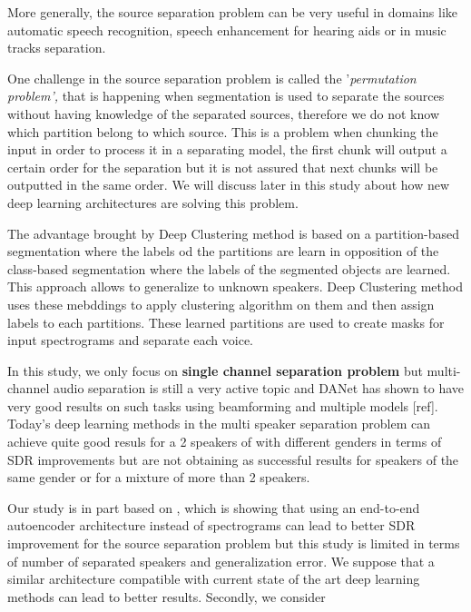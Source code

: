 \documentclass[master,final,11pt]{iscs-thesis}
\begin{document}
More generally, the source separation problem can be very useful in domains like automatic speech recognition, speech enhancement for hearing aids or  
in music tracks separation.


One challenge in the source separation problem is called the '\textit{permutation problem',} that is happening when segmentation is used to separate the sources without having knowledge of the separated sources, therefore we do not know which partition belong to which source. This is a problem when chunking the input in order to process it in a separating model, the first chunk will output a certain order for the separation but it is not assured that next chunks will be outputted in the same order. We will discuss later in this study about how new deep learning architectures are solving this problem.

The advantage brought by Deep Clustering method is based on a partition-based segmentation where the labels od the partitions are learn in opposition of the class-based segmentation where the labels of the segmented objects are learned. This approach allows to generalize to unknown speakers. Deep Clustering method uses these mebddings to apply clustering algorithm on them and then assign labels to each partitions. These learned partitions are used to create masks for input spectrograms and separate each voice.

In this study, we only focus on \textbf{single channel separation problem} but multi-channel audio separation is still a very active topic and DANet has shown to have very good results on such tasks using beamforming and multiple models [ref]. Today's deep learning methods in the multi speaker separation problem  can achieve quite good resuls for a 2 speakers of with different genders in terms of SDR improvements but are not obtaining as successful results for speakers of the same gender or for a mixture of more than 2 speakers. 

Our study is in part based on \cite{Adaptive}, which is showing that using an end-to-end autoencoder architecture instead of spectrograms can lead to better SDR improvement for the source separation problem but this study is limited in terms of number of separated speakers and generalization error. We suppose that a similar architecture compatible with current state of the art deep learning methods can lead to better results. Secondly, we consider
\end{document}

